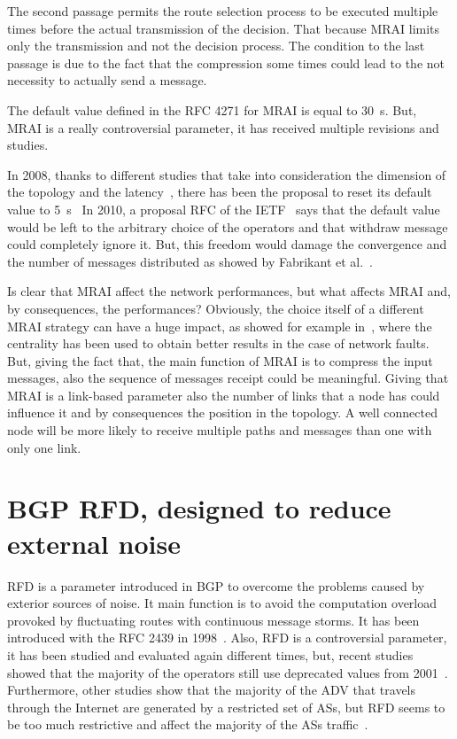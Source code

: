 The second passage permits the route selection process to be executed multiple
times before the actual transmission of the decision.
That because \ac{MRAI} limits only the transmission and not the decision process.
The condition to the last passage is due to the fact that the compression some
times could lead to the not necessity to actually send a message.

The default value defined in the \ac{RFC} \num{4271} for \ac{MRAI} is equal to
\SI{30}{\second}.
But, \ac{MRAI} is a really controversial parameter, it has received multiple
revisions and studies.

In \num{2008}, thanks to different studies that take into consideration the
dimension of the topology and the latency~\cite{qiu2005optimal}, there has been
the proposal to reset its default value to \SI{5}{\second}~\cite{jakma2008revised}
In \num{2010}, a proposal \ac{RFC} of the \ac{IETF}~\cite{jakma2010revisions}
says that the default value would be left to the arbitrary choice of the operators and
that withdraw message could completely ignore it.
But, this freedom would damage the convergence and the number of messages distributed
as showed by Fabrikant et al.~\cite{fabrikant2011there}.

Is clear that \ac{MRAI} affect the network performances, but what affects \ac{MRAI}
and, by consequences, the performances?
Obviously, the choice itself of a different \ac{MRAI} strategy can have a huge
impact, as showed for example in~\cite{milani2019BGP}, where the centrality
has been used to obtain better results in the case of network faults.
But, giving the fact that, the main function of \ac{MRAI} is to compress the
input messages, also the sequence of messages receipt could be meaningful.
Giving that \ac{MRAI} is a link-based parameter also the number of links that
a node has could influence it and by consequences the position in the topology.
A well connected node will be more likely to receive multiple paths and messages
than one with only one link.

\section{BGP RFD, designed to reduce external noise}
\label{sec:bgp_rfd}

\ac{RFD} is a parameter introduced in \ac{BGP} to overcome the problems caused
by exterior sources of noise.
It main function is to avoid the computation overload provoked by fluctuating
routes with continuous message storms.
It has been introduced with the \ac{RFC} \num{2439} in \num{1998}~\cite{rfc2439}.
Also, \ac{RFD} is a controversial parameter, it has been studied and evaluated again
different times, but, recent studies showed that the majority of the operators
still use deprecated values from \num{2001}~\cite{gray2020bgp}.
Furthermore, other studies show that the majority of the \ac{ADV} that travels
through the Internet are generated by a restricted set of \acp{AS}, but \ac{RFD}
seems to be too much restrictive and affect the majority of the \acp{AS} traffic~\cite{pelsser2011route}.

